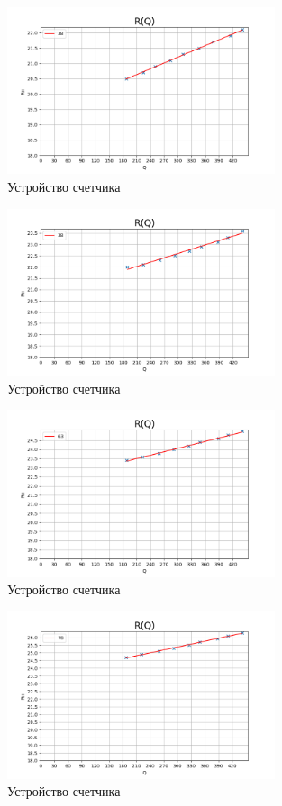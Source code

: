 \documentclass[a4paper]{article}
\begin{document}
\begin{figure}
\centering
\includegraphics[width=0.7\textwidth]{38.png}
\caption{Устройство счетчика}
\end{figure}

\begin{figure}
    \centering
    \includegraphics[width=0.7\textwidth]{48.png}
    \caption{Устройство счетчика}
\end{figure}

\begin{figure}
    \centering
    \includegraphics[width=0.7\textwidth]{63.png}
    \caption{Устройство счетчика}
\end{figure}

\begin{figure}
    \centering
    \includegraphics[width=0.7\textwidth]{78.png}
    \caption{Устройство счетчика}
\end{figure}
\end{document}
